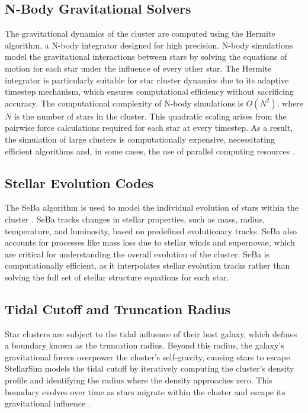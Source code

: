 \documentclass[10pt,twocolumn]{article}
\begin{document}
\subsection{N-Body Gravitational Solvers}
The gravitational dynamics of the cluster are computed using the Hermite algorithm, a N-body integrator designed for high precision. N-body simulations model the gravitational interactions between stars by solving the equations of motion for each star under the influence of every other star. The Hermite integrator is particularly suitable for star cluster dynamics due to its adaptive timestep mechanism, which ensures computational efficiency without sacrificing accuracy. The computational complexity of N-body simulations is $O(N^2)$, where $N$ is the number of stars in the cluster. This quadratic scaling arises from the pairwise force calculations required for each star at every timestep. As a result, the simulation of large clusters is computationally expensive, necessitating efficient algorithms and, in some cases, the use of parallel computing resources \cite{Hut1995}.

\subsection{Stellar Evolution Codes}
The SeBa algorithm is used to model the individual evolution of stars within the cluster \cite{PortegiesZwart1996}. SeBa tracks changes in stellar properties, such as mass, radius, temperature, and luminosity, based on predefined evolutionary tracks. SeBa also accounts for processes like mass loss due to stellar winds and supernovae, which are critical for understanding the overall evolution of the cluster. SeBa is computationally efficient, as it interpolates stellar evolution tracks rather than solving the full set of stellar structure equations for each star.

\subsection{Tidal Cutoff and Truncation Radius}
Star clusters are subject to the tidal influence of their host galaxy, which defines a boundary known as the truncation radius. Beyond this radius, the galaxy’s gravitational forces overpower the cluster’s self-gravity, causing stars to escape. StellarSim models the tidal cutoff by iteratively computing the cluster's density profile and identifying the radius where the density approaches zero. This boundary evolves over time as stars migrate within the cluster and escape its gravitational influence \cite{Takahashi2000}.
\end{document}
